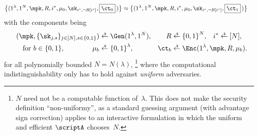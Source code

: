 \begin{definition}
\begin{align*}
\WideNarrow{}{&}
\bigl\{(
1^\lambda,1^N,\mpk,R,i^\ast,\mu_0,\sk_{i^\ast,\neg R[i^\ast]},\boxed{\ct_0}\,
)\bigr\}
\WideNarrow{}{\\}
{}\approx{}&
\bigl\{(
1^\lambda,1^N,\mpk,R,i^\ast,\mu_0,\sk_{i^\ast,\neg R[i^\ast]},\boxed{\ct_1}\,
)\bigr\}
\end{align*}
with the components being
\begin{align*}
(\mpk,\{\sk_{j,s}\}_{j\in[N],s\in\bit})
&{}\draws\Gen(1^\lambda,1^N),&
R&{}\draws\bit^N,&
i^\ast&{}\draws[N],\\
\textup{for }b\in\bit,\WideNarrow{\qquad}{}\qquad
\mu_b&{}\draws\bit^\lambda,&
\ct_b&\mathrlap{{}\draws\Enc(1^\lambda,\mpk,R,\mu_b).}
\end{align*}
for all polynomially bounded ${N=N(\lambda)}$,%
\footnote{$N$ need not be a computable function of~$\lambda$.
This does not make the security definition ``non-uniformy'',
as a standard guessing argument (with advantage sign correction) applies to an interactive formulation
in which the uniform and efficient $\scriptA$ chooses~$N$.}
where the computational indistinguishability only has to hold against \emph{uniform} adversaries.
\end{definition}
